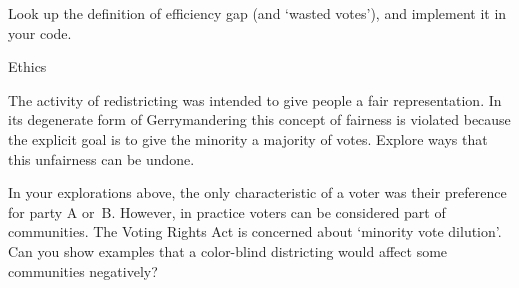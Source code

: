 \begin{exercise}
  Look up the definition of efficiency gap (and `wasted votes'), and
  implement it in your code.
\end{exercise}

 {Ethics}

The activity of redistricting was intended to give people a fair representation.
In its degenerate form of Gerrymandering this concept of fairness is violated
because the explicit goal is to give the minority a majority of votes.
Explore ways that this unfairness can be undone.

In your explorations above, the only characteristic of a voter was their preference
for party A or~B. However, in practice voters can be considered part of communities.
The Voting Rights Act is concerned about `minority vote dilution'.
Can you show examples that a color-blind districting
would affect some communities negatively?
